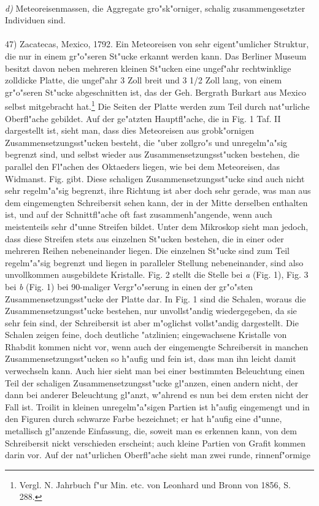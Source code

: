 \documentclass[a4paper, 11pt, oneside, german]{article}
\begin{document}
\paragraph{}
\emph{d)} Meteoreisenmassen, die Aggregate gro"sk"orniger, schalig zusammengesetzter Individuen sind.
\vspace{\medskipamount}
\paragraph{}
47) Zacatecas, Mexico, 1792. Ein Meteoreisen von sehr eigent"umlicher Struktur, die nur in einem gr"o"seren St"ucke erkannt werden kann. Das Berliner Museum besitzt davon neben mehreren kleinen St"ucken eine ungef"ahr rechtwinklige zolldicke Platte, die ungef"ahr 3 Zoll breit und 3 1/2 Zoll lang, von einem gr"o"seren St"ucke abgeschnitten ist, das der Geh. Bergrath Burkart aus Mexico selbst mitgebracht hat.\footnote{Vergl. N. Jahrbuch f"ur Min. etc. von Leonhard und Bronn von 1856, S. 288.} Die Seiten der Platte werden zum Teil durch nat"urliche Oberfl"ache gebildet. Auf der ge"atzten Hauptfl"ache, die in Fig. 1 Taf. II dargestellt ist, sieht man, dass dies Meteoreisen aus grobk"ornigen Zusammensetzungsst"ucken besteht, die "uber zollgro"s und unregelm"a"sig begrenzt sind, und selbst wieder aus Zusammensetzungsst"ucken bestehen, die parallel den Fl"achen des Oktaeders liegen, wie bei dem Meteoreisen, das Widmanst. Fig. gibt. Diese schaligen Zusammensetzungsst"ucke sind auch nicht sehr regelm"a"sig begrenzt, ihre Richtung ist aber doch sehr gerade, was man aus dem eingemengten Schreibersit sehen kann, der in der Mitte derselben enthalten ist, und auf der Schnittfl"ache oft fast zusammenh"angende, wenn auch meistenteils sehr d"unne Streifen bildet. Unter dem Mikroskop sieht man jedoch, dass diese Streifen stets aus einzelnen St"ucken bestehen, die in einer oder mehreren Reihen nebeneinander liegen. Die einzelnen St"ucke sind zum Teil regelm"a"sig begrenzt und liegen in paralleler Stellung nebeneinander, sind also unvollkommen ausgebildete Kristalle. Fig. 2 stellt die Stelle bei \emph{a} (Fig. 1), Fig. 3 bei \emph{b} (Fig. 1) bei 90-maliger Vergr"o"serung in einen der gr"o"sten Zusammensetzungsst"ucke der Platte dar. In Fig. 1 sind die Schalen, woraus die Zusammensetzungsst"ucke bestehen, nur unvollst"andig wiedergegeben, da sie sehr fein sind, der Schreibersit ist aber m"oglichst vollst"andig dargestellt. Die Schalen zeigen feine, doch deutliche "atzlinien; eingewachsene Kristalle von Rhabdit kommen nicht vor, wenn auch der eingemengte Schreibersit in manchen Zusammensetzungsst"ucken so h"aufig und fein ist, dass man ihn leicht damit verwechseln kann. Auch hier sieht man bei einer bestimmten Beleuchtung einen Teil der schaligen Zusammensetzungsst"ucke gl"anzen, einen andern nicht, der dann bei anderer Beleuchtung gl"anzt, w"ahrend es nun bei dem ersten nicht der Fall ist. Troilit in kleinen unregelm"a"sigen Partien ist h"aufig eingemengt und in den Figuren durch schwarze Farbe bezeichnet; er hat h"aufig eine d"unne, metallisch gl"anzende Einfassung, die, soweit man es erkennen kann, von dem Schreibersit nickt verschieden erscheint; auch kleine Partien von Grafit kommen darin vor. Auf der nat"urlichen Oberfl"ache sieht man zwei runde, rinnenf"ormige 
\end{document}
